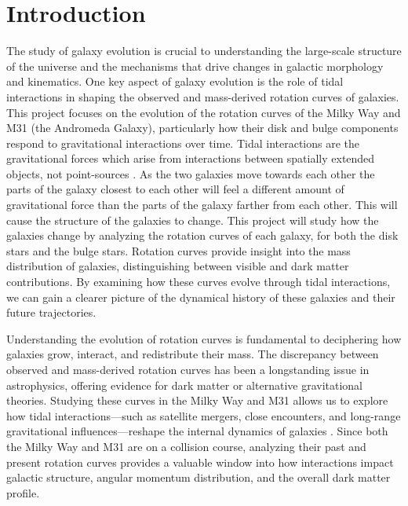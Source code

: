 \documentclass[twocolumn,linenumbers,trackchanges]{aastex7}
\begin{document}
\section{Introduction}
The study of galaxy evolution is crucial to understanding the large-scale structure of the universe and the mechanisms that drive changes in galactic morphology and kinematics.
One key aspect of galaxy evolution is the role of tidal interactions in shaping the observed and mass-derived rotation curves of galaxies.
This project focuses on the evolution of the rotation curves of the Milky Way and M31 (the Andromeda Galaxy), particularly how their disk and bulge components respond to gravitational interactions over time.
Tidal interactions are the gravitational forces which arise from interactions between spatially extended objects, not point-sources \citep{GalacticBulges}.
As the two galaxies move towards each other the parts of the galaxy closest to each other will feel a different amount of gravitational force than the parts of the galaxy farther from each other. This will cause the structure of the galaxies to change.
This project will study how the galaxies change by analyzing the rotation curves of each galaxy, for both the disk stars and the bulge stars.
Rotation curves provide insight into the mass distribution of galaxies, distinguishing between visible and dark matter contributions.
By examining how these curves evolve through tidal interactions, we can gain a clearer picture of the dynamical history of these galaxies and their future trajectories.

Understanding the evolution of rotation curves is fundamental to deciphering how galaxies grow, interact, and redistribute their mass.
The discrepancy between observed and mass-derived rotation curves has been a longstanding issue in astrophysics, offering evidence for dark matter or alternative gravitational theories.
Studying these curves in the Milky Way and M31 allows us to explore how tidal interactions—such as satellite mergers, close encounters, and long-range gravitational influences—reshape the internal dynamics of galaxies \citep{Hopkins2007}.
Since both the Milky Way and M31 are on a collision course, analyzing their past and present rotation curves provides a valuable window into how interactions impact galactic structure, angular momentum distribution, and the overall dark matter profile.
\end{document}

